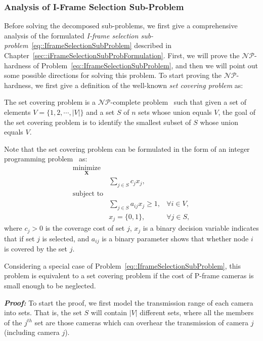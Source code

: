 \subsubsection{Analysis of I-Frame Selection Sub-Problem}
Before solving the decomposed sub-problems, we first give a comprehensive analysis of the formulated \emph{I-frame selection sub-problem}~\eqref{eq::IframeSelectionSubProblem} described in Chapter~\ref{sec::iFrameSelectionSubProbFormulation}.
First, we will prove the $\mathcal{NP}$-hardness of Problem~\eqref{eq::IframeSelectionSubProblem}, and then we will point out some possible directions for solving this problem.
To start proving the $\mathcal{NP}$-hardness, we first give a definition of the well-known \emph{set covering problem} as:
\begin{mydef}
The set covering problem is a $\mathcal{NP}$-complete problem~\cite{SetCoveringNPComplete} such that given a set of elements $V = \{1,2,\cdots,|V|\}$ and a set $S$ of $n$ sets whose union equals $V$, the goal of the set covering problem is to identify the smallest subset of $S$ whose union equals $V$.
\label{def::SCP}
\end{mydef}
Note that the set covering problem can be formulated in the form of an integer programming problem~\cite{SetCoveringFormulation} as:
\begin{align}
\underset{\mathbf{X}}{\text{minimize}} & & \nonumber \\
 &\sum_{j \in S} c_j x_j, & \nonumber \\
\text{subject to} & & \nonumber \\
 &\sum_{j \in S} a_{ij}x_j \geq 1, &\forall i \in V, \nonumber \\
 &x_{j} = \{0,1\}, &\forall j \in S,
\label{eq::SetCoveringProblemFormualtion}
\end{align}
where $c_j > 0$ is the coverage cost of set $j$, $x_j$ is a binary decision variable indicates that if set $j$ is selected, and $a_{ij}$ is a binary parameter shows that whether node $i$ is covered by the set $j$.
\begin{mylem}
Considering a special case of Problem~\eqref{eq::IframeSelectionSubProblem}, this problem is equivalent to a set covering problem if the cost of P-frame cameras is small enough to be neglected.
\label{lemma::ReduceProb}
\end{mylem}
\textbf{\emph{Proof:}}
To start the proof, we first model the transmission range of each camera into sets.
That is, the set $S$ will contain $|V|$ different sets, where all the members of the $j^{th}$ set are those cameras which can overhear the transmission of camera $j$ (including camera $j$).
